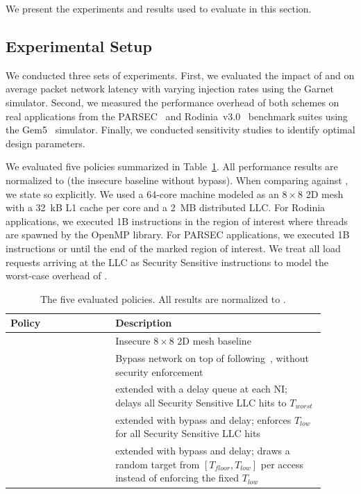 We present the experiments and results used to evaluate \scheme{} in this section.

\subsection{Experimental Setup} \label{sec:eval-setup}
We conducted three sets of experiments.
First, we evaluated the impact of \jscheme{} and \bscheme{} on average packet network latency with varying injection rates using the Garnet~\cite{agarwal2009garnet} simulator.
Second, we measured the performance overhead of both schemes on real applications from the PARSEC~\cite{bienia2008parsec} and Rodinia~v3.0~\cite{che2009rodinia} benchmark suites using the Gem5~\cite{binkert2011gem5} simulator.
Finally, we conducted sensitivity studies to identify optimal design parameters.

We evaluated five policies summarized in Table~\ref{tab:policies}.
All performance results are normalized to \basescheme{} (the insecure baseline without bypass).
When comparing against \basebscheme{}, we state so explicitly.
We used a 64-core machine modeled as an $8\times8$ 2D mesh with a 32~kB L1 cache per core and a 2~MB distributed LLC.
For Rodinia applications, we executed 1B instructions in the region of interest where threads are spawned by the OpenMP library.
For PARSEC applications, we executed 1B instructions or until the end of the marked region of interest.
We treat all load requests arriving at the LLC as Security Sensitive instructions to model the worst-case overhead of \scheme{}.

\begin{table}[t]
    \centering
    \begin{tabular}{|p{0.3\linewidth}|p{0.6\linewidth}|}
        \hline \hline
        \textbf{Policy} & \textbf{Description} 
        \\ \hline
        \basescheme{} 
        & Insecure $8\times8$ 2D mesh baseline 
        \\ \hline
        \basebscheme{} 
        & Bypass network on top of \basescheme{} following~\cite{perez2019smart++}, without security enforcement \\ 
        \hline
        \jscheme{} 
        & \basescheme{} extended with a delay queue at each NI; delays all Security Sensitive LLC hits to $T_{worst}$ \\ 
        \hline
        \bscheme{} 
        & \basescheme{} extended with bypass and delay; enforces $T_{low}$ for all Security Sensitive LLC hits \\ 
        \hline
        \rscheme{}
        & \basescheme{} extended with bypass and delay; draws a random target from $[T_{floor}, T_{low}]$ per access instead of enforcing the fixed $T_{low}$ \\
        \hline
    \end{tabular}
    \caption{The five evaluated policies. 
    All results are normalized to \basescheme{}.}
    \label{tab:policies}
\end{table}

